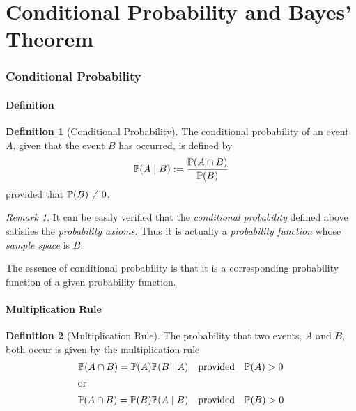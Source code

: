 \documentclass[10pt,UTF8]{article}
\newenvironment{definition box}
{\begin{tcolorbox}[colback=blue!5!white,colframe=blue!75!black,parbox=false,before upper=\par,before lower=\par]}
{\end{tcolorbox}}
\newenvironment{theorem box}
{\begin{tcolorbox}[colback=yellow!5!white,colframe=yellow!75!black,parbox=false,before upper=\par,before lower=\par]}
{\end{tcolorbox}}
\theoremstyle{definition}
\newtheorem{definition inner}{Definition}[section]
\newenvironment{definition}[1][]
{\begin{definition box}\begin{definition inner}[#1]\hfill\par}
{\end{definition inner}\end{definition box}}
\theoremstyle{plain}
\newtheorem{theorem inner}{Theorem}[section]
\theoremstyle{definition}
\newtheorem*{proof inner}{\textit{Proof}}
\theoremstyle{remark}
\newtheorem*{remark}{\textit{Remark}}
\newcommand{\Prob}{\mathbb{P}\qty}
\begin{document}
\part*{Conditional Probability and Bayes' Theorem}

\section{Conditional Probability}

\subsection{Definition}

\begin{definition}[Conditional Probability]
    The conditional probability of an event $A$, given that
    the event $B$ has occurred, is defined by
    \begin{equation*}
        \Prob(A\mid B) := \frac{\Prob(A\cap B)}{\Prob(B)}
    \end{equation*}
    provided that $\Prob(B)\ne 0$.
\end{definition}

\begin{remark}
    It can be easily verified that the \emph{conditional probability} defined above
    satisfies the \emph{probability axioms}.
    Thus it is actually a \emph{probability function} whose \emph{sample space} is $B$.
    
    The essence of conditional probability is that
    it is a corresponding probability function
    of a given probability function.
\end{remark}

\subsection{Multiplication Rule}

\begin{definition}[Multiplication Rule]
    The probability that two events, $A$ and $B$, both occur is given
    by the multiplication rule
    \begin{gather*}
        \Prob(A\cap B) = \Prob(A)\Prob(B\mid A) \qq{provided} \Prob(A) > 0 \\
        \shortintertext{or}
        \Prob(A\cap B) = \Prob(B)\Prob(A\mid B) \qq{provided} \Prob(B) > 0
    \end{gather*}
\end{definition}
\end{document}
